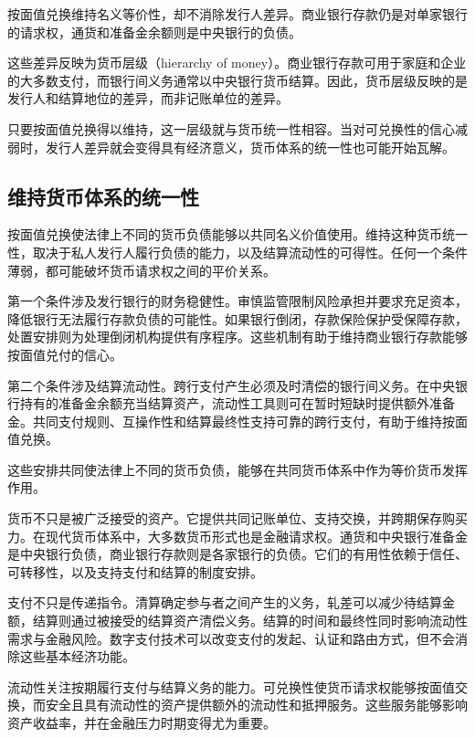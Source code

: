 按面值兑换维持名义等价性，却不消除发行人差异。商业银行存款仍是对单家银行的请求权，通货和准备金余额则是中央银行的负债。

这些差异反映为货币层级（hierarchy of money）。商业银行存款可用于家庭和企业的大多数支付，而银行间义务通常以中央银行货币结算。因此，货币层级反映的是发行人和结算地位的差异，而非记账单位的差异。

只要按面值兑换得以维持，这一层级就与货币统一性相容。当对可兑换性的信心减弱时，发行人差异就会变得具有经济意义，货币体系的统一性也可能开始瓦解。

\subsection{维持货币体系的统一性}

按面值兑换使法律上不同的货币负债能够以共同名义价值使用。维持这种货币统一性，取决于私人发行人履行负债的能力，以及结算流动性的可得性。任何一个条件薄弱，都可能破坏货币请求权之间的平价关系。

第一个条件涉及发行银行的财务稳健性。审慎监管限制风险承担并要求充足资本，降低银行无法履行存款负债的可能性。如果银行倒闭，存款保险保护受保障存款，处置安排则为处理倒闭机构提供有序程序。这些机制有助于维持商业银行存款能够按面值兑付的信心。

第二个条件涉及结算流动性。跨行支付产生必须及时清偿的银行间义务。在中央银行持有的准备金余额充当结算资产，流动性工具则可在暂时短缺时提供额外准备金。共同支付规则、互操作性和结算最终性支持可靠的跨行支付，有助于维持按面值兑换。

这些安排共同使法律上不同的货币负债，能够在共同货币体系中作为等价货币发挥作用。



货币不只是被广泛接受的资产。它提供共同记账单位、支持交换，并跨期保存购买力。在现代货币体系中，大多数货币形式也是金融请求权。通货和中央银行准备金是中央银行负债，商业银行存款则是各家银行的负债。它们的有用性依赖于信任、可转移性，以及支持支付和结算的制度安排。

支付不只是传递指令。清算确定参与者之间产生的义务，轧差可以减少待结算金额，结算则通过被接受的结算资产清偿义务。结算的时间和最终性同时影响流动性需求与金融风险。数字支付技术可以改变支付的发起、认证和路由方式，但不会消除这些基本经济功能。

流动性关注按期履行支付与结算义务的能力。可兑换性使货币请求权能够按面值交换，而安全且具有流动性的资产提供额外的流动性和抵押服务。这些服务能够影响资产收益率，并在金融压力时期变得尤为重要。

